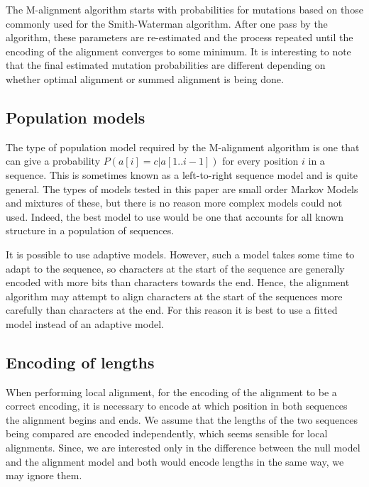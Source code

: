 \documentclass[a4paper,11pt,oneside]{article}
\begin{document}
The M-alignment algorithm starts with probabilities for mutations based on
those commonly used for the Smith-Waterman algorithm.  After one pass by the
algorithm, these parameters are re-estimated and the process repeated until
the encoding of the alignment converges to some minimum.  It is interesting to
note that the final estimated mutation probabilities are different depending
on whether optimal alignment or summed alignment is being done.


\subsection{Population models}

The type of population model required by the M-alignment algorithm is one that
can give a probability $P(a[i]=c|a[1..i-1])$ for every position $i$ in a
sequence.  This is sometimes known as a left-to-right sequence model and is
quite general.  The types of models tested in this paper are small order
Markov Models and mixtures of these, but there is no reason more complex models
could not used.  Indeed, the best model to use would be one that accounts for
all known structure in a population of sequences.

It is possible to use adaptive models.  However, such a model takes some time
to adapt to the sequence, so characters at the start of the sequence are
generally encoded with more bits than characters towards the end.  Hence, the
alignment algorithm may attempt to align characters at the start of the
sequences more carefully than characters at the end.  For this reason it is
best to use a fitted model instead of an adaptive model.

\subsection{Encoding of lengths}

When performing local alignment, for the encoding of the alignment to be a
correct encoding, it is necessary to encode at which position in both
sequences the alignment begins and ends.  We assume that the lengths of the
two sequences being compared are encoded independently, which seems sensible
for local alignments.  Since, we are interested only in the difference between
the null model and the alignment model and both would encode lengths in the
same way, we may ignore them.
\end{document}
